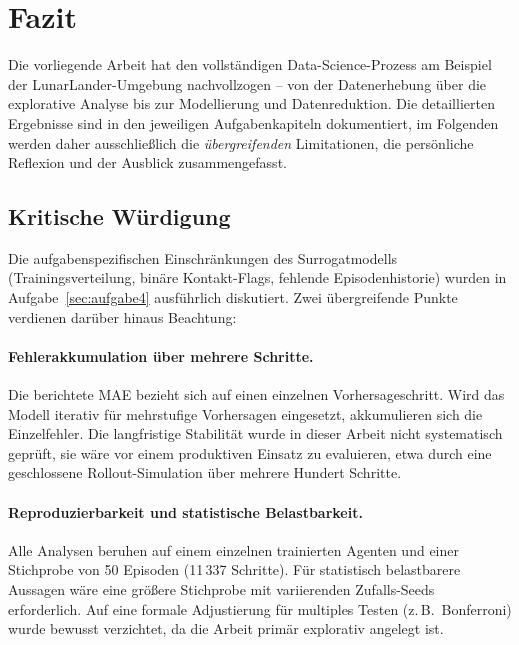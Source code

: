 
\section{Fazit}
\label{sec:fazit}

Die vorliegende Arbeit hat den vollständigen Data-Science-Prozess am Beispiel der LunarLander-Umgebung nachvollzogen -- von der Datenerhebung über die explorative Analyse bis zur Modellierung und Datenreduktion. Die detaillierten Ergebnisse sind in den jeweiligen Aufgabenkapiteln dokumentiert, im Folgenden werden daher ausschließlich die \emph{übergreifenden} Limitationen, die persönliche Reflexion und der Ausblick zusammengefasst.

\subsection{Kritische Würdigung}
\label{sec:kritik}

Die aufgabenspezifischen Einschränkungen des Surrogatmodells (Trainingsverteilung, binäre Kontakt-Flags, fehlende Episodenhistorie) wurden in Aufgabe~\ref{sec:aufgabe4} ausführlich diskutiert. Zwei übergreifende Punkte verdienen darüber hinaus Beachtung:

\paragraph{Fehlerakkumulation über mehrere Schritte.}
Die berichtete \ac{MAE} bezieht sich auf einen einzelnen Vorhersageschritt. Wird das Modell iterativ für mehrstufige Vorhersagen eingesetzt, akkumulieren sich die Einzelfehler. Die langfristige Stabilität wurde in dieser Arbeit nicht systematisch geprüft, sie wäre vor einem produktiven Einsatz zu evaluieren, etwa durch eine geschlossene Rollout-Simulation über mehrere Hundert Schritte.

\paragraph{Reproduzierbarkeit und statistische Belastbarkeit.}
Alle Analysen beruhen auf einem einzelnen trainierten Agenten und einer Stichprobe von 50 Episoden (11\,337 Schritte). Für statistisch belastbarere Aussagen wäre eine größere Stichprobe mit variierenden Zufalls-Seeds erforderlich. Auf eine formale Adjustierung für multiples Testen (z.\,B.\ Bonferroni) wurde bewusst verzichtet, da die Arbeit primär explorativ angelegt ist.

